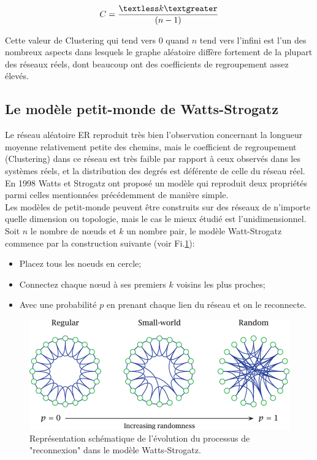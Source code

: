  \begin{equation}
 C=\dfrac{\textless k\textgreater}{(n - 1)}
 \end{equation}
 
Cette valeur de Clustering qui tend vers $0$ quand $n$ tend vers l'infini est l'un des nombreux aspects dans lesquels le graphe aléatoire diffère fortement de la plupart des réseaux réels, dont beaucoup ont des coefficients de regroupement assez élevés.
 
 
 \subsection{Le modèle petit-monde de Watts-Strogatz}
 

   Le réseau aléatoire ER reproduit très bien l'observation concernant la longueur moyenne relativement petite des chemins, mais le coefficient de regroupement (Clustering) dans ce réseau est très faible par rapport à ceux observés dans les systèmes réels, et la distribution des degrés est déférente de celle du réseau réel. En 1998 Watts et Strogatz \cite{Watss-Strogatz1998} ont proposé un modèle qui reproduit deux propriétés parmi celles mentionnées précédemment de manière simple.\\
   Les modèles de petit-monde peuvent être construits sur des réseaux de n'importe quelle dimension ou topologie, mais le cas le mieux étudié est l'unidimensionnel. Soit $n$ le nombre de nœuds et $k$ un nombre pair, le modèle Watt-Strogatz commence par la construction suivante (voir Fi.\ref{SW1}): 
   \begin{itemize}
   	\item Placez tous les noeuds en cercle;
   	\item Connectez chaque nœud à ses premiers $k$ voisins les plus proches;
   	\item  Avec une probabilité $p$ en prenant chaque lien du réseau et on le reconnecte.
   \end{itemize}
   \begin{figure}[h!]
   	\centering
   	\includegraphics[scale=0.6]{./figures/SW1}
   	\caption{Représentation schématique de l'évolution du processus de "reconnexion" dans le modèle Watts-Strogatz.}  	
   	\label{SW1}
   \end{figure}


